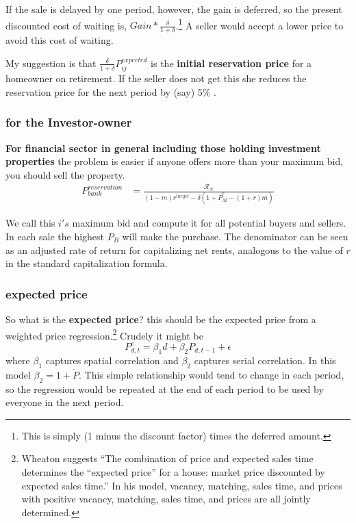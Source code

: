 {If the sale is delayed by one period, however, the gain is deferred, so the present discounted cost of waiting is, $Gain*\frac{\delta}{1+\delta}$.\footnote{This is simply (1 minus the discount factor) times the deferred amount.} A seller would accept a lower price to avoid this cost of waiting. 

My suggestion is that $\frac{\delta}{1+\delta}P_{ij}^{expected}$ is the \textbf{initial reservation price} for a homeowner on retirement. If the seller does not get this she reduces the reservation price for the next period by (say) 5\% .


\subsubsection{for the Investor-owner}
\textbf{For financial sector in general including those holding investment properties} the problem is easier if anyone offers more than your maximum bid, you should sell the property. 
\begin{eqnarray}
P_{bank}^{reservation} & =    \frac{\mathcal{R}_N}{(1-m)r^{target}-\delta \left(1 + \dot P_M^e - (1+r)m\right)} \label{eqn-res-price-B} \end{eqnarray}

We call this  $i's$ maximum bid and compute it for all potential buyers and sellers. In each sale the highest $P_B$ will make the purchase. The denominator can be seen as an adjusted rate of return for capitalizing net rents, analogous to the value of $r$ in  the standard capitalization formula. 



\subsubsection{expected price}
So what is the \textbf{expected price}? this should be the expected price from a weighted price regression.\footnote{Wheaton \cite{wheatonVacancySearchPrices1990} suggests ``The combination of price and expected sales time determines the ``expected price'' for a house: market price discounted by expected sales time.'' In his model, vacancy, matching, sales time, and prices with positive vacancy, matching, sales time, and prices are all jointly determined.} Crudely it might be
\[P_{d,t}^e=\beta_1 d + \beta_2 P_{d,t-1} +\epsilon\]
where $\beta_1$ captures spatial correlation and $\beta_2$ captures serial correlation. In this model $\beta_2=1+\dot P$. This simple relationship would tend to change in each period, so the regression would be repeated  at the end of each period  to be used by everyone in the next period. 

}
